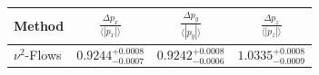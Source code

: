     \begin{tabular}{lccc}
        \toprule
        Method & $\frac{\Delta p_x}{\langle |p_x|\rangle}$ & $\frac{\Delta p_y}{\langle |p_y|\rangle}$ & $\frac{\Delta p_z}{\langle |p_z|\rangle}$ \\
        \midrule
        $\nu^2$-Flows & $0.9244^{+0.0008}_{-0.0007}$ & $0.9242^{+0.0008}_{-0.0006}$ & $1.0335^{+0.0008}_{-0.0009}$ \\
        \bottomrule
    \end{tabular}